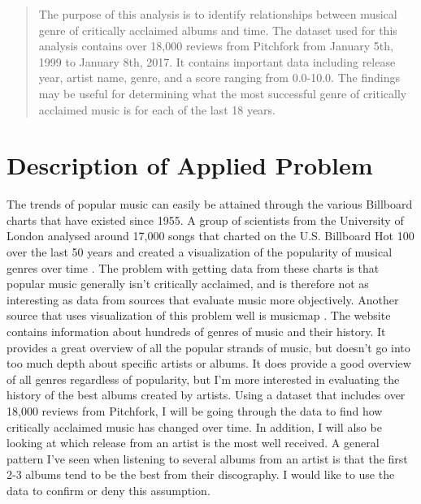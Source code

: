 \documentclass{article}
\begin{document}


\begin{abstract} 
{\bf } The purpose of this analysis is to identify relationships between
musical genre of critically acclaimed albums and time. The dataset used
for this analysis contains over 18,000 reviews from Pitchfork from
January 5th, 1999 to January 8th, 2017. It contains important data
including release year, artist name, genre, and a score ranging from
0.0-10.0. The findings may be useful for determining what the most
successful genre of critically acclaimed music is for each of the last
18 years. \end{abstract} 


\section{Description of Applied
Problem}\label{description-of-applied-problem}

The trends of popular music can easily be attained through the various
Billboard charts that have existed since 1955. A group of scientists
from the University of London analysed around 17,000 songs that charted
on the U.S. Billboard Hot 100 over the last 50 years and created a
visualization of the popularity of musical genres over time
\citep{Billboard100}. The problem with getting data from these charts is
that popular music generally isn't critically acclaimed, and is
therefore not as interesting as data from sources that evaluate music
more objectively. Another source that uses visualization of this problem
well is musicmap \citep{musicmap}. The website contains information
about hundreds of genres of music and their history. It provides a great
overview of all the popular strands of music, but doesn't go into too
much depth about specific artists or albums. It does provide a good
overview of all genres regardless of popularity, but I'm more interested
in evaluating the history of the best albums created by artists. Using a
dataset that includes over 18,000 reviews from Pitchfork, I will be
going through the data to find how critically acclaimed music has
changed over time. In addition, I will also be looking at which release
from an artist is the most well received. A general pattern I've seen
when listening to several albums from an artist is that the first 2-3
albums tend to be the best from their discography. I would like to use
the data to confirm or deny this assumption.
\end{document}
